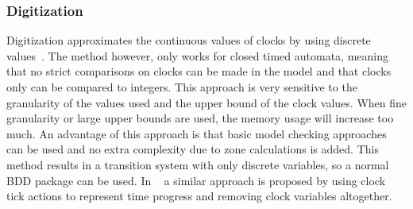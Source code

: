 \subsubsection{Digitization}
Digitization approximates the continuous values of clocks by using discrete values~\cite{CHARME01}. The method however, only works for closed timed automata, meaning that no strict comparisons on clocks can be made in the model and that clocks only can be compared to integers. This approach is very sensitive to the granularity of the values used and the upper bound of the clock values. When fine granularity or large upper bounds are used, the memory usage will increase too much. An advantage of this approach is that basic model checking approaches can be used and no extra complexity due to zone calculations is added. This method results in a transition system with only discrete variables, so a normal BDD package can be used. In ~\cite{nguyen2012discrete} a similar approach is proposed by using clock tick actions to represent time progress and removing clock variables altogether.

